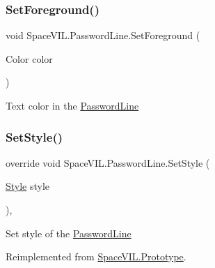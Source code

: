 \mbox{\label{class_space_v_i_l_1_1_password_line_a9ca1d5dc8f4f3f3036f8a8098930b350}} 
\subsubsection{\texorpdfstring{Set\+Foreground()}{SetForeground()}}
{\footnotesize\ttfamily void Space\+V\+I\+L.\+Password\+Line.\+Set\+Foreground (\begin{DoxyParamCaption}\item[{Color}]{color }\end{DoxyParamCaption})\hspace{0.3cm}{\ttfamily [inline]}}



Text color in the \mbox{\hyperlink{class_space_v_i_l_1_1_password_line}{Password\+Line}} 

\mbox{\label{class_space_v_i_l_1_1_password_line_a96f208561afd0f7e997c79fe85aa4d6d}} 
\subsubsection{\texorpdfstring{Set\+Style()}{SetStyle()}}
{\footnotesize\ttfamily override void Space\+V\+I\+L.\+Password\+Line.\+Set\+Style (\begin{DoxyParamCaption}\item[{\mbox{\hyperlink{class_space_v_i_l_1_1_decorations_1_1_style}{Style}}}]{style }\end{DoxyParamCaption})\hspace{0.3cm}{\ttfamily [inline]}, {\ttfamily [virtual]}}



Set style of the \mbox{\hyperlink{class_space_v_i_l_1_1_password_line}{Password\+Line}} 



Reimplemented from \mbox{\hyperlink{class_space_v_i_l_1_1_prototype_ae96644a6ace490afb376fb542161e541}{Space\+V\+I\+L.\+Prototype}}.

